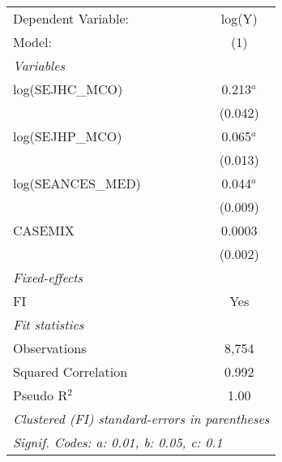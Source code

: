
\begingroup
\centering
\begin{tabular}{lc}
   \tabularnewline \midrule \midrule
   Dependent Variable: & log(Y)\\  
   Model:              & (1)\\  
   \midrule
   \emph{Variables}\\
   log(SEJHC\_MCO)     & 0.213$^{a}$\\   
                       & (0.042)\\   
   log(SEJHP\_MCO)     & 0.065$^{a}$\\   
                       & (0.013)\\   
   log(SEANCES\_MED)   & 0.044$^{a}$\\   
                       & (0.009)\\   
   CASEMIX             & 0.0003\\   
                       & (0.002)\\   
   \midrule
   \emph{Fixed-effects}\\
   FI                  & Yes\\  
   \midrule
   \emph{Fit statistics}\\
   Observations        & 8,754\\  
   Squared Correlation & 0.992\\  
   Pseudo R$^2$        & 1.00\\  
   \midrule \midrule
   \multicolumn{2}{l}{\emph{Clustered (FI) standard-errors in parentheses}}\\
   \multicolumn{2}{l}{\emph{Signif. Codes: a: 0.01, b: 0.05, c: 0.1}}\\
\end{tabular}
\par\endgroup


